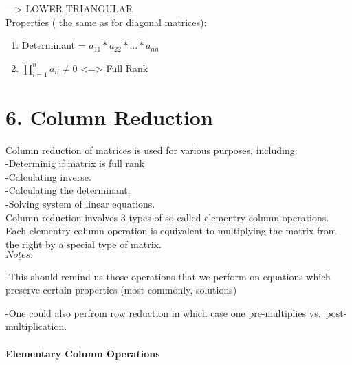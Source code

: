 \documentclass[]{article}
\providecommand{\tightlist}{%
  \setlength{\itemsep}{0pt}\setlength{\parskip}{0pt}}
\let\oldparagraph\paragraph
\renewcommand{\paragraph}[1]{\oldparagraph{#1}\mbox{}}
\begin{document}
---\textgreater{} LOWER TRIANGULAR\\

Properties ( the same as for diagonal matrices):

\begin{enumerate}
\def\labelenumi{\alph{enumi})}
\tightlist
\item
  Determinant = \(a_{11}*a_{22}*...*a_{nn}\)\\
\item
  \(\prod_{i=1}^{n}a_{ii} \neq 0\) \textless{}=\textgreater{} Full
  Rank\\
\end{enumerate}

\section{\texorpdfstring{6. Column Reduction\\
}{6. Column Reduction }}\label{column-reduction}

Column reduction of matrices is used for various purposes, including:\\

-Determinig if matrix is full rank\\[2\baselineskip] -Calculating
inverse.\\[2\baselineskip] -Calculating the
determinant.\\[2\baselineskip] -Solving system of linear equations.\\

Column reduction involves 3 types of so called elementry column
operations.\\

Each elementry column operation is equivalent to multiplying the matrix
from the right by a special type of matrix.\\

\(\underline{Notes:}\)

-This should remind us those operations that we perform on equations
which preserve certain properties (most commonly, solutions)

-One could also perfrom row reduction in which case one pre-multiplies
vs.~post-multiplication.\\

\paragraph{\texorpdfstring{Elementary Column Operations\\
}{Elementary Column Operations }}\label{elementary-column-operations}
\end{document}
